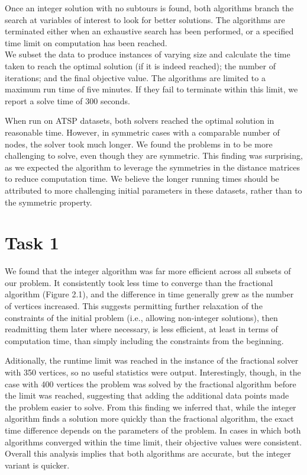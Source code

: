 \documentclass[12pt]{article}
\numberwithin{equation}{section}
\begin{document}
Once an integer solution with no subtours is found, both algorithms branch the search at variables of interest to look for better solutions. The algorithms are terminated either when an exhaustive search has been performed, or a specified time limit on computation has been reached.\\

We subset the data to produce instances of varying size and calculate the time taken to reach the optimal solution (if it is indeed reached); the number of iterations; and the final objective value. The algorithms are limited to a maximum run time of five minutes. If they fail to terminate within this limit, we report a solve time of 300 seconds.

When run on ATSP datasets, both solvers reached the optimal solution in reasonable time. However, in symmetric cases with a comparable number of nodes, the solver took much longer. We found the problems in \cite{web:tsp} to be more challenging to solve, even though they are symmetric. This finding was surprising, as we expected the algorithm to leverage the symmetries in the distance matrices to reduce computation time. We believe the longer running times should be attributed to more challenging initial parameters in these datasets, rather than to the symmetric property. 

\section{Task 1}

 We found that the integer algorithm was far more efficient across all subsets of our problem. It consistently took less time to converge than the fractional algorithm (Figure 2.1), and the difference in time generally grew as the number of vertices increased. This suggests permitting further relaxation of the constraints of the initial problem (i.e., allowing non-integer solutions), then readmitting them later where necessary, is less efficient, at least in terms of computation time, than simply including the constraints from the beginning. 
 
 Aditionally, the runtime limit was reached in the instance of the fractional solver with 350 vertices, so no useful statistics were output. Interestingly, though, in the case with 400 vertices the problem was solved by the fractional algorithm before the limit was reached, suggesting that adding the additional data points made the problem easier to solve. From this finding we inferred that, while the integer algorithm finds a solution more quickly than the fractional algorithm, the exact time difference depends on the parameters of the problem. In cases in which both algorithms converged within the time limit, their objective values were consistent. Overall this analysis implies that both algorithms are accurate, but the integer variant is quicker. 
 
\end{document}
